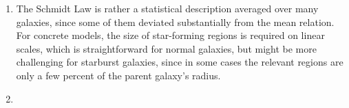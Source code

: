 \documentclass[11pt,a4paper]{scrartcl}
\begin{document}
\begin{enumerate}[label=\textbf{\large(\alph*)}, itemsep=\baselineskip]
\item
    The Schmidt Law is rather a statistical description averaged over many
    galaxies, since some of them deviated substantially from the mean
    relation. \\
    For concrete models, the size of star-forming regions is required on linear
    scales, which is straightforward for normal galaxies, but might be more
    challenging for starburst galaxies, since in some cases the relevant
    regions are only a few percent of the parent galaxy's radius.

\item



\end{enumerate}
\end{document}
